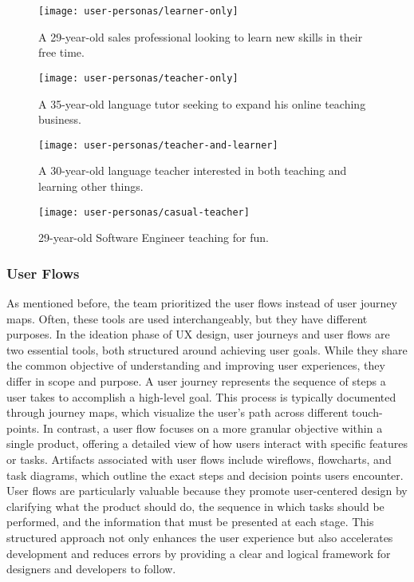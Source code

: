 \begin{figure}[h]
    \centering
    \texttt{[image: user-personas/learner-only]}
    \caption{A 29-year-old sales professional looking to learn new skills in their free time.}\label{fig:figure}
\end{figure}
\begin{figure}[t]
    \centering
    \texttt{[image: user-personas/teacher-only]}
    \caption{A 35-year-old language tutor seeking to expand his online teaching business.}\label{fig:figure2}
\end{figure}
\begin{figure}[h]
    \centering
    \texttt{[image: user-personas/teacher-and-learner]}
    \caption{A 30-year-old language teacher interested in both teaching and learning other things.}\label{fig:figure3}
\end{figure}
\begin{figure}[b]
    \centering
    \texttt{[image: user-personas/casual-teacher]}
    \caption{ 29-year-old Software Engineer teaching for fun.}\label{fig:figure4}
\end{figure}

\clearpage
\subsubsection{User Flows}\label{subsubsec:user-flows}
As mentioned before, the team prioritized the user flows instead of user journey maps.
Often, these tools are used interchangeably, but they have different purposes.
In the ideation phase of UX design, user journeys and user flows are two essential tools, both structured around achieving user goals.
While they share the common objective of understanding and improving user experiences, they differ in scope and purpose.
A user journey represents the sequence of steps a user takes to accomplish a high-level goal.
This process is typically documented through journey maps, which visualize the user's path across different touch-points.
In contrast, a user flow focuses on a more granular objective within a single product, offering a detailed view of how users interact with specific features or tasks.
Artifacts associated with user flows include wireflows, flowcharts, and task diagrams, which outline the exact steps and decision points users encounter.
User flows are particularly valuable because they promote user-centered design by clarifying what the product should do, the sequence in which tasks should be performed, and the information that must be presented at each stage.
This structured approach not only enhances the user experience but also accelerates development and reduces errors by providing a clear and logical framework for designers and developers to follow.\cite[User Journeys vs User Flows]{userJourneys}